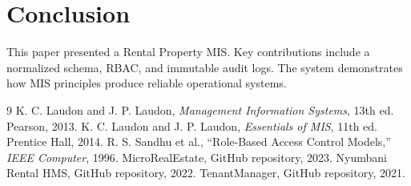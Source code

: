 \documentclass[conference]{IEEEtran}
\begin{document}
\section{Conclusion}

This paper presented a Rental Property MIS. Key contributions include a normalized schema, RBAC, and immutable audit logs. The system demonstrates how MIS principles produce reliable operational systems.

\begin{thebibliography}{9}
 K. C. Laudon and J. P. Laudon, \textit{Management Information Systems}, 13th ed. Pearson, 2013.
 K. C. Laudon and J. P. Laudon, \textit{Essentials of MIS}, 11th ed. Prentice Hall, 2014.
 R. S. Sandhu et al., ``Role-Based Access Control Models,'' \textit{IEEE Computer}, 1996.
 MicroRealEstate, GitHub repository, 2023.
 Nyumbani Rental HMS, GitHub repository, 2022.
 TenantManager, GitHub repository, 2021.
\end{thebibliography}
\end{document}
